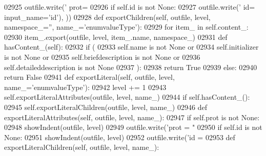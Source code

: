 \begin{DoxyCode}
{{{{{{{{{{{{{{{{{{{{{{{{{{{{{{{{{{{{{{{{{{{{{{{{{{{{{{{{{{{{{{{{{{{{{{{{{{{{{{{{{{{{{{{{{{{{{{{{{{{{{{{{{{{{{{{{{{{{{{{{{{{{{{{{{{{{{{{{{{{{{{{{{{{{{{{{{{{{{{{{{{{{{{{{{{{{{{{{{{{{{{{{{{{{{{{{{{{{{{{02925             outfile.write(\textcolor{stringliteral}{' prot=%
02926         \textcolor{keywordflow}{if} self.id \textcolor{keywordflow}{is} \textcolor{keywordflow}{not} \textcolor{keywordtype}{None}:
02927             outfile.write(\textcolor{stringliteral}{' id=%
      input\_name=\textcolor{stringliteral}{'id'}), ))
02928     \textcolor{keyword}{def }exportChildren(self, outfile, level, namespace\_='', name\_='enumvalueType'):
02929         \textcolor{keywordflow}{for} item\_ \textcolor{keywordflow}{in} self.content_:
02930             item\_.export(outfile, level, item\_.name, namespace\_)
02931     \textcolor{keyword}{def }hasContent_(self):
02932         \textcolor{keywordflow}{if} (
02933             self.name \textcolor{keywordflow}{is} \textcolor{keywordflow}{not} \textcolor{keywordtype}{None} \textcolor{keywordflow}{or}
02934             self.initializer \textcolor{keywordflow}{is} \textcolor{keywordflow}{not} \textcolor{keywordtype}{None} \textcolor{keywordflow}{or}
02935             self.briefdescription \textcolor{keywordflow}{is} \textcolor{keywordflow}{not} \textcolor{keywordtype}{None} \textcolor{keywordflow}{or}
02936             self.detaileddescription \textcolor{keywordflow}{is} \textcolor{keywordflow}{not} \textcolor{keywordtype}{None}
02937             ):
02938             \textcolor{keywordflow}{return} \textcolor{keyword}{True}
02939         \textcolor{keywordflow}{else}:
02940             \textcolor{keywordflow}{return} \textcolor{keyword}{False}
02941     \textcolor{keyword}{def }exportLiteral(self, outfile, level, name\_='enumvalueType'):
02942         level += 1
02943         self.exportLiteralAttributes(outfile, level, name\_)
02944         \textcolor{keywordflow}{if} self.hasContent_():
02945             self.exportLiteralChildren(outfile, level, name\_)
02946     \textcolor{keyword}{def }exportLiteralAttributes(self, outfile, level, name\_):
02947         \textcolor{keywordflow}{if} self.prot \textcolor{keywordflow}{is} \textcolor{keywordflow}{not} \textcolor{keywordtype}{None}:
02948             showIndent(outfile, level)
02949             outfile.write(\textcolor{stringliteral}{'prot = "%
02950         \textcolor{keywordflow}{if} self.id \textcolor{keywordflow}{is} \textcolor{keywordflow}{not} \textcolor{keywordtype}{None}:
02951             showIndent(outfile, level)
02952             outfile.write(\textcolor{stringliteral}{'id = %
02953     \textcolor{keyword}{def }exportLiteralChildren(self, outfile, level, name\_):
}}}}}}}}}}}}}}}}}}}}}}}}}}}}}}}}}}}}}}}}}}}}}}}}}}}}}}}}}}}}}}}}}}}}}}}}}}}}}}}}}}}}}}}}}}}}}}}}}}}}}}}}}}}}}}}}}}}}}}}}}}}}}}}}}}}}}}}}}}}}}}}}}}}}}}}}}}}}}}}}}}}}}}}}}}}}}}}}}}}}}}}}}}}}}}}}}}}}}}}}}}}
\end{DoxyCode}
